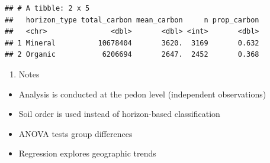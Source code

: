\documentclass[
]{article}
\providecommand{\tightlist}{%
  \setlength{\itemsep}{0pt}\setlength{\parskip}{0pt}}
\begin{document}
\begin{verbatim}
## # A tibble: 2 x 5
##   horizon_type total_carbon mean_carbon     n prop_carbon
##   <chr>               <dbl>       <dbl> <int>       <dbl>
## 1 Mineral          10678404       3620.  3169       0.632
## 2 Organic           6206694       2647.  2452       0.368
\end{verbatim}

\begin{enumerate}
\def\labelenumi{\arabic{enumi}.}
\setcounter{enumi}{6}
\tightlist
\item
  Notes
\end{enumerate}

\begin{itemize}
\tightlist
\item
  Analysis is conducted at the pedon level (independent observations)
\item
  Soil order is used instead of horizon-based classification
\item
  ANOVA tests group differences
\item
  Regression explores geographic trends
\end{itemize}
\end{document}

